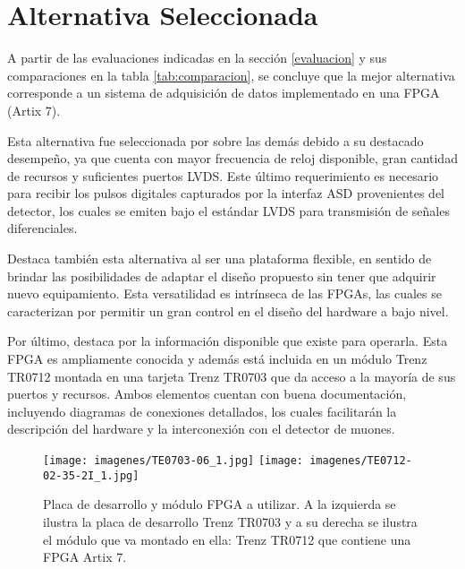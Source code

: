 \section{Alternativa Seleccionada}
\label{alternativa}

\par A partir de las evaluaciones indicadas en la sección \ref{evaluacion} y sus comparaciones en la tabla \ref{tab:comparacion}, se concluye que la mejor alternativa corresponde a un sistema de adquisición de datos implementado en una FPGA (Artix 7\cite{Xilinx20107DS180}).
\par Esta alternativa fue seleccionada por sobre las demás debido a su destacado desempeño, ya que cuenta con mayor frecuencia de reloj disponible, gran cantidad de recursos y suficientes puertos LVDS. Este último requerimiento es necesario para recibir los pulsos digitales capturados por la interfaz ASD\cite{1999ATLASICs} provenientes del detector, los cuales se emiten bajo el estándar LVDS para transmisión de señales diferenciales.
\par Destaca también esta alternativa al ser una plataforma flexible, en sentido de brindar las posibilidades de adaptar el diseño propuesto sin tener que adquirir nuevo equipamiento. Esta versatilidad es intrínseca de las FPGAs, las cuales se caracterizan por permitir un gran control en el diseño del hardware a bajo nivel.
\par Por último, destaca por la información disponible que existe para operarla. Esta FPGA es ampliamente conocida y además está incluida en un módulo Trenz TR0712\cite{TrenzElectronic2019TR07012Wiki} montada en una tarjeta Trenz TR0703\cite{TrenzElectronic2019TR0703Wiki} que da acceso a la mayoría de sus puertos y recursos. Ambos elementos cuentan con buena documentación, incluyendo diagramas de conexiones detallados, los cuales facilitarán la descripción del hardware y la interconexión con el detector de muones.

\begin{figure}[H]
    \centering
    \texttt{[image: imagenes/TE0703-06\_1.jpg]}
    \texttt{[image: imagenes/TE0712-02-35-2I\_1.jpg]}
    \caption{Placa de desarrollo y módulo FPGA a utilizar. A la izquierda se ilustra la placa de desarrollo Trenz TR0703\cite{TrenzElectronic2019TR0703Wiki} y a su derecha se ilustra el módulo que va montado en ella: Trenz TR0712\cite{TrenzElectronic2019TR07012Wiki} que contiene una FPGA Artix 7\cite{Xilinx20107DS180}.}
    \label{fig:trenz}
\end{figure}


